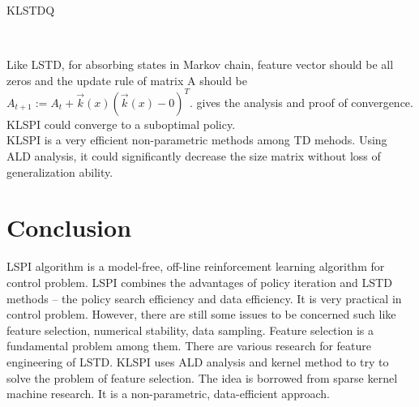 \begin{algorithm}[H]
\caption{KLSTDQ}
\label{alg:KLSTDQ}
\begin{algorithmic}
	\\ 
	\ENDIF
	\ENDFOR		
	\ENDFOR		
	\RETURN { $\alpha^\pi$}		
\end{algorithmic}
\end{algorithm}
\noindent
Like LSTD, for absorbing states in Markov chain, feature vector should be all zeros and the update rule of matrix A should be $A_{t+1} := A_t + \vec k(x) (\vec k(x) - 0 )^T$. \cite{xu2007kernel} gives the analysis and proof of convergence. KLSPI could converge to a suboptimal policy.\\
KLSPI is a very efficient non-parametric methods among TD mehods. Using ALD analysis, it could significantly decrease the size matrix without loss of generalization ability.

\section{Conclusion}
LSPI algorithm is a model-free, off-line reinforcement learning algorithm for control problem. LSPI combines the advantages of policy iteration and LSTD methods -- the policy search efficiency and data efficiency. It is very practical in control problem. However, there are still some issues to be concerned such like feature selection, numerical stability, data sampling. Feature selection is a fundamental problem among them. There are various research for feature engineering of LSTD.  KLSPI uses ALD analysis and kernel method to try to solve the problem of feature selection. The idea is borrowed from sparse kernel machine research. It is a non-parametric, data-efficient approach. 





  \newpage

